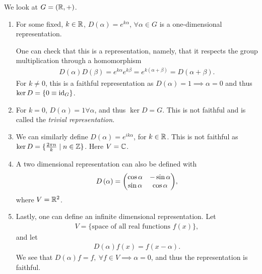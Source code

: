 \begin{examples} We look at $G = \left( \mathbb{R}, + \right) $.
    \begin{enumerate}[label=\arabic*)]
        \item For some fixed, $k \in \mathbb{R}$, $D \left( \alpha  \right)= e^{k\alpha} $, $\forall \alpha \in G$ is a one-dimensional representation. 

            One can check that this is a representation, namely, that it respects the group multiplication through a homomorphism
            \begin{align}
                D \left( \alpha \right) D\left( \beta \right) = e^{k \alpha} e^{k \beta} = e^{k \left( \alpha + \beta \right) } = D \left( \alpha + \beta \right) 
            .\end{align}
            For $k \neq 0$, this is a faithful representation as $D\left( \alpha \right) = 1 \implies \alpha = 0$ and thus $\ker D = \{0 \equiv \text{id}_G\} $.
        \item For $k = 0$, $D \left( \alpha \right) = 1 \forall \alpha$, and thus $\ker D = G$. This is not faithful and is called the \textit{trivial representation}.
        \item We can similarly define $D \left( \alpha \right) = e^{ik \alpha}$, for $k \in \mathbb{R}$. This is not faithful as $\ker D = \{\frac{2\pi n}{k}  \mid n \in \mathbb{Z}\} $. Here $V = \mathbb{C}$.
        \item A two dimensional representation can also be defined with
            \begin{align}
                D \left( \alpha \right) = \mqty( \cos \alpha & - \sin \alpha \\ \sin \alpha & \cos \alpha )
            ,\end{align}
            where $V = \mathbb{R}^2$.
        \item Lastly, one can define an infinite dimensional representation. Let
            \begin{align}
                V = \{\text{space of all real functions $f\left( x \right) $}\} 
            ,\end{align}
            and let
            \begin{align}
                D \left( \alpha \right) f\left( x \right) = f \left( x - \alpha \right) 
            .\end{align}
            We see that $D \left( \alpha \right) f = f,~ \forall f \in V \implies \alpha = 0$, and thus the representation is faithful.
    \end{enumerate}
\end{examples}

